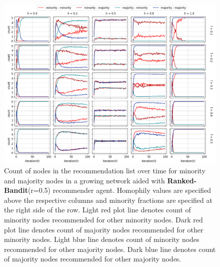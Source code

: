 \begin{appendices}

\begin{figure}[h!]
	\centering
	\includegraphics[width=1.0\textwidth]{images/count_rb05.png}
	\caption{Count of nodes in the recommendation list over time for minority and majority nodes in a growing network aided with \textbf{Ranked-Bandit}(r=0.5) recommender agent. Homophily values are specified above the respective columns and minority fractions are specified at the right side of the row. Light red plot line denotes count of minority nodes recommended for other minority nodes. Dark red plot line denotes count of majority nodes recommended for other minority nodes. Light blue line denotes count of minority nodes recommended for other majority nodes. Dark blue line denotes count of majority nodes recommended for other majority nodes.}
	\label{count_rb05}
\end{figure}


\end{appendices}
